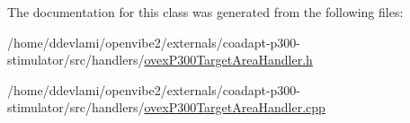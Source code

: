The documentation for this class was generated from the following files:\begin{DoxyCompactItemize}
\item 
/home/ddevlami/openvibe2/externals/coadapt-\/p300-\/stimulator/src/handlers/\hyperlink{ovexP300TargetAreaHandler_8h}{ovexP300TargetAreaHandler.h}\item 
/home/ddevlami/openvibe2/externals/coadapt-\/p300-\/stimulator/src/handlers/\hyperlink{ovexP300TargetAreaHandler_8cpp}{ovexP300TargetAreaHandler.cpp}\end{DoxyCompactItemize}
